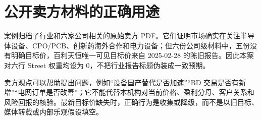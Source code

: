 \section{公开卖方材料的正确用途}
案例归档了行业和六家公司相关的原始卖方 PDF。它们证明市场确实在关注半导体设备、CPO/PCB、创新药海外合作和电力设备；但六份公司级材料中，五份没有明确目标价，百利天恒唯一可见目标价来自 2025-02-28 的陈旧报告。因此本案对六行 Street 权重均设为 0，不把行业报告标题伪装成一致预期。

\begin{sourcequalitybox}[卖方信息的使用边界]
卖方观点可以帮助提出问题，例如“设备国产替代是否加速”“BD 交易是否有新增”“电网订单是否改善”；它不能代替本机构对当前价格、盈利分母、客户关系和风险回报的核验。最新目标价缺失时，正确行为是收集或降级，而不是以旧目标、媒体转载或内部乐观假设填空。
\end{sourcequalitybox}
